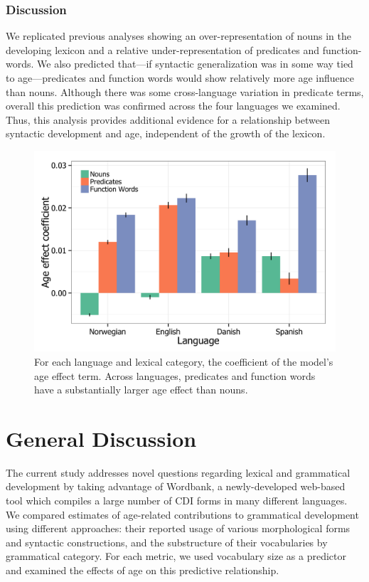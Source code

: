 \documentclass[10pt,letterpaper]{article}
\begin{document}
\subsubsection{Discussion}

We replicated previous analyses \cite{bates1994} showing an over-representation of nouns in the developing lexicon and a relative under-representation of predicates and function-words. We also predicted that---if syntactic generalization was in some way tied to age---predicates and function words would show relatively more age influence than nouns. Although there was some cross-language variation in predicate terms, overall this prediction was confirmed across the four languages we examined. Thus, this analysis provides additional evidence for a relationship between syntactic development and age, independent of the growth of the lexicon.

\begin{figure}
\centering
\includegraphics[width=\linewidth]{plots/coefs_vocab_comp.png}
\caption{\label{fig:coefs_vocab_comp} For each language and lexical category, the coefficient of the model's age effect term. Across languages, predicates and function words have a substantially larger age effect than nouns.}
\end{figure}

\section{General Discussion}

The current study addresses novel questions regarding lexical and grammatical development by taking advantage of Wordbank, a newly-developed web-based tool which compiles a large number of CDI forms in many different languages.  We compared estimates of age-related contributions to grammatical development using different approaches: their reported usage of various morphological forms and syntactic constructions, and the substructure of their vocabularies by grammatical category. For each metric, we used vocabulary size as a predictor and examined the effects of age on this predictive relationship.
\end{document}
